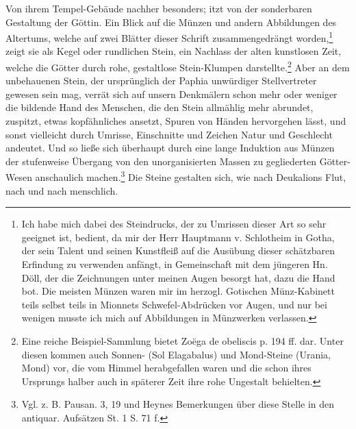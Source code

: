 \documentclass[a4paper, 11pt, oneside, polutonikogreek, german]{article}
\begin{document}
Von ihrem Tempel-Gebäude nachher besonders; itzt von der sonderbaren Gestaltung der Göttin. Ein Blick auf die Münzen und andern Abbildungen des Altertums, welche auf zwei Blätter dieser Schrift zusammengedrängt worden,\footnote{Ich habe mich dabei des Steindrucks, der zu Umrissen dieser Art so sehr geeignet ist, bedient, da mir der Herr Hauptmann v. Schlotheim in Gotha, der sein Talent und seinen Kunstfleiß auf die Ausübung dieser schätzbaren Erfindung zu verwenden anfängt, in Gemeinschaft mit dem jüngeren Hn. Döll, der die Zeichnungen unter meinen Augen besorgt hat, dazu die Hand bot. Die meisten Münzen waren mir im herzogl. Gotischen Münz-Kabinett teils selbst teils in Mionnets Schwefel-Abdrücken vor Augen, und nur bei wenigen musste ich mich auf Abbildungen in Münzwerken verlassen.} zeigt sie als Kegel oder rundlichen Stein, ein Nachlass der alten kunstlosen Zeit, welche die Götter durch rohe, gestaltlose Stein-Klumpen darstellte.\footnote{Eine reiche Beispiel-Sammlung bietet Zoëga de obeliscis p. 194 ff. dar. Unter diesen kommen auch Sonnen- (Sol Elagabalus) und Mond-Steine (Urania, Mond) vor, die vom Himmel herabgefallen waren und die schon ihres Ursprungs halber auch in späterer Zeit ihre rohe Ungestalt behielten.} Aber an dem unbehauenen Stein, der ursprünglich der Paphia unwürdiger Stellvertreter gewesen sein mag, verrät sich auf unsern Denkmälern schon mehr oder weniger die bildende Hand des Menschen, die den Stein allmählig mehr abrundet, zuspitzt, etwas kopfähnliches ansetzt, Spuren von Händen hervorgehen lässt, und sonst vielleicht durch Umrisse, Einschnitte und Zeichen Natur und Geschlecht andeutet. Und so ließe sich überhaupt durch eine lange Induktion aus Münzen der stufenweise Übergang von den unorganisierten Massen zu gegliederten Götter-Wesen anschaulich machen.\footnote{Vgl. z. B. Pausan. 3, 19 und Heynes Bemerkungen über diese Stelle in den antiquar. Aufsätzen St. 1 S. 71 f.} Die Steine gestalten sich, wie nach Deukalions Flut, nach und nach menschlich.
\end{document}
